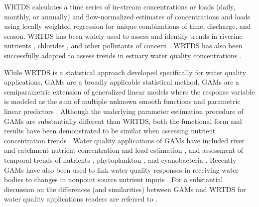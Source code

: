 \documentclass[fleqn,10pt,lineno]{wlpeerj} %
\begin{document}
WRTDS calculates a time series of in-stream concentrations or loads
(daily, monthly, or annually) and flow-normalized estimates of
concentrations and loads using locally weighted regression for unique
combinations of time, discharge, and season. WRTDS has been widely used
to assess and identify trends in riverine nutrients
\autocite{oelsner_recent_2019,stackpooleLongTermMississippi2021},
chlorides \autocite{stetsIncreasingChlorideRivers2018}, and other
pollutants of concern \autocite{shodaWaterqualityTrendsRivers2019}.
WRTDS has also been successfully adapted to assess trends in estuary
water quality concentrations \autocite{beckFourDecadesWater2018}.

While WRTDS is a statistical approach developed specifically for water
quality applications, GAMs are a broadly applicable statistical method.
GAMs are a semiparametric extension of generalized linear models where
the response variable is modeled as the sum of multiple unknown smooth
functions and parametric linear predictors
\autocite{woodFastStableRestricted2011}. Although the underlying
parameter estimation procedure of GAMs are substantially different than
WRTDS, both the functional form and results have been demonstrated to be
similar when assessing nutrient concentration trends
\autocite{beckNumericalQualitativeContrasts2017}. Water quality
applications of GAMs have included river and catchment nutrient
concentration and load estimation
\autocite{wangLoadEstimationUncertainties2011,kroonRiverLoadsSuspended2012,kuhnertQuantifyingTotalSuspended2012,robson_prediction_2015-1,hagemannEstimatingNutrientOrganic2016,mcdowell_implications_2021,biagi_novel_2022},
and assessment of temporal trends of nutrients
\autocite{beckNumericalQualitativeContrasts2017,murphyGeneralizedAdditiveModel2019},
phytoplankton \autocite{bergbuschUnexpectedShiftPhytoplankton2021}, and
cyanobacteria \autocite{hayesEffectsLakeWarming2020}. Recently GAMs have
also been used to link water quality responses in receiving water bodies
to changes in nonpoint source nutrient inputs
\autocite{murphyNutrientImprovementsChesapeake2022}. For a substantial
discussion on the differences (and similarities) between GAMs and WRTDS
for water quality applications readers are referred to
\textcite{beckNumericalQualitativeContrasts2017}.
\end{document}

